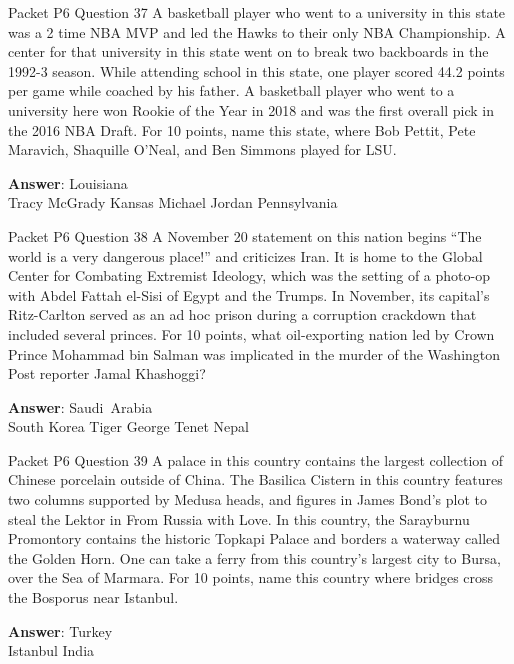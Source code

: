 \begin{frame}{Packet P6 Question 37}
A basketball player who   went to a university in this state was a 2 time NBA MVP and led the Hawks to their only NBA Championship. A center for that university in this state went on to break two backboards in the 1992-3 season. While attending school in this state, one player scored 44.2 points per game while coached by his father. A basketball player who went to a university here won Rookie of the Year in 2018 and was the first overall pick in the 2016 NBA Draft. For 10 points, name this state, where Bob Pettit, Pete Maravich, Shaquille O’Neal, and Ben Simmons played for LSU.      

\textbf{Answer}: Louisiana\\
 Tracy McGrady
 Kansas
 Michael Jordan
 Pennsylvania
\end{frame}

\begin{frame}{Packet P6 Question 38}
A November 20 statement on this nation begins “The world is a very dangerous place!” and criticizes Iran. It is home to the Global Center for Combating Extremist Ideology, which was the setting of a photo-op with Abdel Fattah el-Sisi of Egypt and the Trumps. In November, its capital's Ritz-Carlton served as an ad hoc prison during a corruption crackdown that included several princes. For 10 points, what oil-exporting nation led by Crown Prince Mohammad bin Salman was implicated in the murder of the Washington Post reporter Jamal Khashoggi?        

\textbf{Answer}: Saudi\ Arabia\\
 South Korea
 Tiger
 George Tenet
 Nepal
\end{frame}

\begin{frame}{Packet P6 Question 39}
A palace in this country contains the largest collection of Chinese porcelain outside of China. The Basilica Cistern in this country features two columns supported by Medusa heads, and figures in James Bond's plot to steal the Lektor in From Russia with Love. In this country, the Sarayburnu Promontory contains the historic Topkapi Palace and   borders a waterway called the Golden Horn. One can take a ferry from this country's largest city to Bursa, over the Sea of Marmara. For 10     points, name this country where bridges cross the Bosporus near Istanbul.  

\textbf{Answer}: Turkey\\
 Istanbul
 India
\end{frame}

